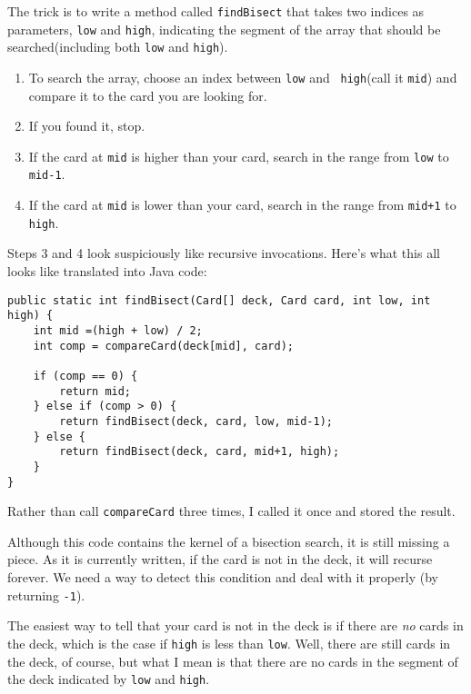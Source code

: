 \documentclass{book}
\begin{document}

The trick is to write a method called {\tt findBisect} that takes
two indices as parameters, {\tt low} and {\tt high}, indicating the
segment of the array that should be searched(including both
{\tt low} and {\tt high}).

\begin{enumerate}

\item To search the array, choose an index between {\tt low} and {\tt
high}(call it {\tt mid}) and compare it to the card you are looking
for.

\item If you found it, stop.

\item If the card at {\tt mid} is higher than your card, search
in the range from {\tt low} to {\tt mid-1}.

\item If the card at {\tt mid} is lower than your card, search
in the range from {\tt mid+1} to {\tt high}.

\end{enumerate}

Steps 3 and 4 look suspiciously like recursive invocations.  Here's
what this all looks like translated into Java code:

\begin{verbatim}
public static int findBisect(Card[] deck, Card card, int low, int high) {
    int mid =(high + low) / 2;
    int comp = compareCard(deck[mid], card);

    if (comp == 0) {
        return mid;
    } else if (comp > 0) {
        return findBisect(deck, card, low, mid-1);
    } else {
        return findBisect(deck, card, mid+1, high);
    }
}
\end{verbatim}

Rather than call {\tt compareCard} three times, I called it once
and stored the result.

Although this code contains the kernel of a bisection search, it
is still missing a piece.  As it is currently written,
if the card is not in the deck, it will recurse forever.  We
need a way to detect this condition and deal with it properly
(by returning {\tt -1}).


The easiest way to tell that your card is not in the deck
is if there are {\em no} cards in the deck, which is the
case if {\tt high} is less than {\tt low}.  Well, there are
still cards in the deck, of course, but what I mean is that
there are no cards in the segment of the deck indicated by
{\tt low} and {\tt high}.
\end{document}
